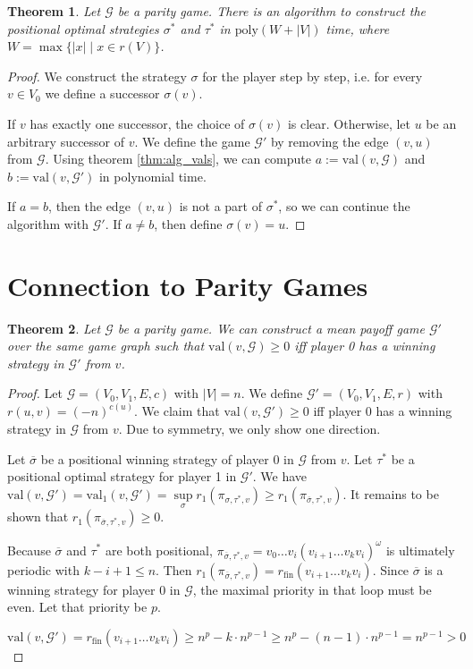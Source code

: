 \documentclass{article}
\newtheorem{theorem}{Theorem}
\begin{document}
\begin{theorem}
	Let $\mathcal{G}$ be a parity game. There is an algorithm to construct the positional optimal strategies $\sigma^*$ and $\tau^*$ in $\text{poly}(W + |V|)$ time, where $W = \max \{ |x| \mid x \in r(V) \}$.
\end{theorem}
\begin{proof}
	We construct the strategy $\sigma$ for the player step by step, i.e. for every $v \in V_0$ we define a successor $\sigma(v)$.
	
	If $v$ has exactly one successor, the choice of $\sigma(v)$ is clear. Otherwise, let $u$ be an arbitrary successor of $v$. We define the game $\mathcal{G}'$ by removing the edge $(v, u)$ from $\mathcal{G}$. Using theorem \ref{thm:alg_vals}, we can compute $a := \text{val}(v, \mathcal{G})$ and $b := \text{val}(v, \mathcal{G}')$ in polynomial time.
	
	If $a = b$, then the edge $(v, u)$ is not a part of $\sigma^*$, so we can continue the algorithm with $\mathcal{G}'$. If $a \neq b$, then define $\sigma(v) = u$.
\end{proof}

\section{Connection to Parity Games}
\begin{theorem}
	Let $\mathcal{G}$ be a parity game. We can construct a mean payoff game $\mathcal{G}'$ over the same game graph such that $\text{val}(v, \mathcal{G}) \geq 0$ iff player 0 has a winning strategy in $\mathcal{G}'$ from $v$.
\end{theorem}
\begin{proof}
	Let $\mathcal{G} = (V_0, V_1, E, c)$ with $|V| = n$. We define $\mathcal{G}' = (V_0, V_1, E, r)$ with $r(u, v) = (-n)^{c(u)}$. We claim that $\text{val}(v, \mathcal{G}') \geq 0$ iff player 0 has a winning strategy in $\mathcal{G}$ from $v$. Due to symmetry, we only show one direction.
	
	Let $\overline{\sigma}$ be a positional winning strategy of player 0 in $\mathcal{G}$ from $v$. Let $\tau^*$ be a positional optimal strategy for player 1 in $\mathcal{G}'$. We have $\text{val}(v, \mathcal{G}') = \text{val}_1(v, \mathcal{G}') = \sup\limits_\sigma r_1(\pi_{\sigma,\tau^*,v}) \geq r_1(\pi_{\overline{\sigma},\tau^*,v})$. It remains to be shown that $r_1(\pi_{\overline{\sigma},\tau^*,v}) \geq 0$.
	
	Because $\overline{\sigma}$ and $\tau^*$ are both positional, $\pi_{\overline{\sigma},\tau^*,v} = v_0 \dots v_i (v_{i+1} \dots v_k v_i)^\omega$ is ultimately periodic with $k - i + 1 \leq n$. Then $r_1(\pi_{\overline{\sigma},\tau^*,v}) = r_\text{fin}(v_{i+1} \dots v_k v_i)$. Since $\overline{\sigma}$ is a winning strategy for player 0 in $\mathcal{G}$, the maximal priority in that loop must be even. Let that priority be $p$.
	
	$$\text{val}(v, \mathcal{G}') = r_\text{fin}(v_{i+1} \dots v_k v_i) \geq n^p - k \cdot n^{p-1} \geq n^p - (n-1) \cdot n^{p-1} = n^{p-1} > 0$$
\end{proof}
\end{document}
